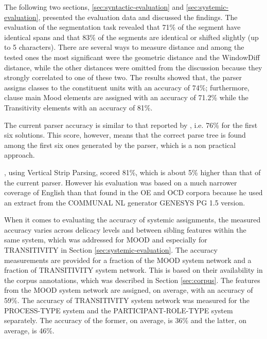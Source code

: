     The following two sections, \ref{sec:syntactic-evaluation} and \ref{sec:systemic-evaluation}, presented the evaluation data and discussed the findings. The evaluation of the segmentation task revealed that 71\% of the segment have identical spans and that 83\% of the segments are identical or shifted slightly (up to 5 characters). There are several ways to measure distance and among the tested ones the most significant were the geometric distance and the WindowDiff distance, while the other distances were omitted from the discussion because they strongly correlated to one of these two. 
    The results showed that, the parser assigns classes to the constituent units with an accuracy of 74\%; furthermore, clause main Mood elements are assigned with an accuracy of 71.2\% while the Transitivity elements with an accuracy of 81\%. 
    
    The current parser accuracy is similar to that reported by \citet{Souter1996}, i.e. 76\% for the first six solutions. This score, however, means that the correct parse tree is found among the first six ones generated by the parser, which is a non practical approach. 
    
    \citet{ODonoghue91}, using Vertical Strip Parsing, scored 81\%, which is about 5\% higher than that of the current parser. However his evaluation was based on a much narrower coverage of English than that found in the OE and OCD corpora because he used an extract from the COMMUNAL NL generator GENESYS PG 1.5 version.
    
    When it comes to evaluating the accuracy of systemic assignments, the measured accuracy varies across delicacy levels and between sibling features within the same system, which was addressed for MOOD and especially for TRANSITIVITY in Section \ref{sec:systemic-evaluation}.
    The accuracy measurements are provided for a fraction of the MOOD system network and a fraction of TRANSITIVITY system network. This is based on their availability in the corpus annotations, which was described in Section \ref{sec:corpus}. The features from the MOOD system network are assigned, on average, with an accuracy of 59\%. The accuracy of TRANSITIVITY system network was measured for the PROCESS-TYPE system and the PARTICIPANT-ROLE-TYPE system separately. The accuracy of the former, on average, is 36\% and the latter, on average, is 46\%. 
    
